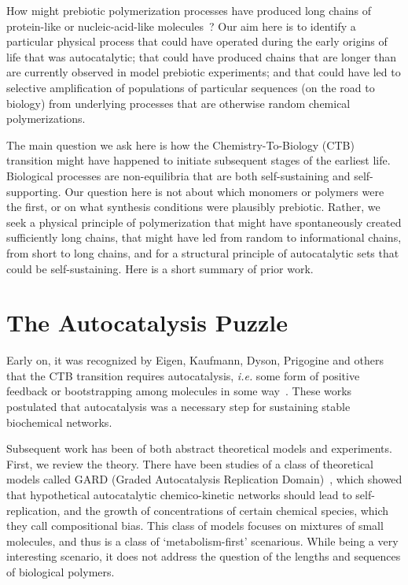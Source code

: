 \documentclass[journal=jacsat,manuscript=article,layout=twocolumn]{achemso}
\begin{document}
 How might prebiotic polymerization processes have produced long chains of protein-like or 
 nucleic-acid-like molecules~\cite{Joyce1987,Abel2005}?  Our aim here is to identify a particular 
physical process that could have operated during the early origins of life that was 
autocatalytic; that could have produced chains that are longer than are currently observed in 
model 
prebiotic experiments; and that could have led to selective amplification of populations of 
particular sequences (on the road to biology) from underlying processes that are otherwise random 
chemical polymerizations.  
 
 The main question we ask here is how the Chemistry-To-Biology (CTB) transition might have happened 
to initiate subsequent stages of the earliest life.  Biological processes are non-equilibria that 
are both self-sustaining and self-supporting.  Our question here is not about which monomers or 
polymers were the first, or on what synthesis conditions were plausibly prebiotic.  Rather, we seek 
a physical principle of polymerization that might have spontaneously created sufficiently long 
chains, that might have led from random to informational chains, from short to long chains, and for 
a structural principle of autocatalytic sets that could be 
self-sustaining.  Here is a short summary of prior work.
 
 \section{The Autocatalysis Puzzle}
 
 Early on, it was recognized by Eigen, Kaufmann, Dyson, Prigogine and others that the CTB 
transition requires autocatalysis, \emph{i.e.} some form of positive feedback or bootstrapping 
among molecules in some 
way~\cite{eigen1971selforganization,Eigen1977,Eigen1978,Dyson1985,Prigogine1989,Kauffman1986}.  
These works postulated that autocatalysis was a necessary step for sustaining stable biochemical 
networks.  
 
 Subsequent work has been of both abstract theoretical models and experiments.  First, we review 
the theory.  There have been studies of a class of theoretical models called GARD (Graded 
Autocatalysis Replication Domain)~\cite{segre1998graded,Segre2000,Markovitch2012}, which showed 
that hypothetical autocatalytic chemico-kinetic networks should lead to self-replication, and the 
growth of concentrations of certain chemical species, which they call compositional bias.  This 
class of models focuses on mixtures of small molecules, and thus is a class of `metabolism-first' 
scenarious. While being a very interesting scenario, it does not address the question of the 
lengths and sequences of biological polymers.
\end{document}
